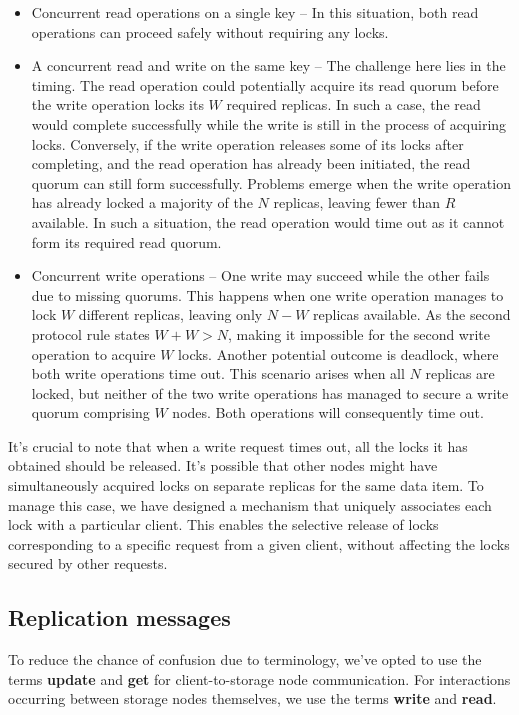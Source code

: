 \documentclass[a4paper, 11pt]{article}
\begin{document}
\begin{itemize}
    \item Concurrent read operations on a single key -- In this situation, both read operations can proceed safely without requiring any locks.
    
    \item A concurrent read and write on the same key -- The challenge here lies in the timing. The read operation could potentially acquire its read quorum before the write operation locks its $ W $ required replicas. In such a case, the read would complete successfully while the write is still in the process of acquiring locks. Conversely, if the write operation releases some of its locks after completing, and the read operation has already been initiated, the read quorum can still form successfully. Problems emerge when the write operation has already locked a majority of the $ N $ replicas, leaving fewer than $ R $ available. In such a situation, the read operation would time out as it cannot form its required read quorum.
    
    \item Concurrent write operations -- One write may succeed while the other fails due to missing quorums. This happens when one write operation manages to lock $ W $ different replicas, leaving only $ N-W $ replicas available. As the second protocol rule states $ W + W > N $, making it impossible for the second write operation to acquire $ W $ locks. Another potential outcome is deadlock, where both write operations time out. This scenario arises when all $ N $ replicas are locked, but neither of the two write operations has managed to secure a write quorum comprising $ W $ nodes. Both operations will consequently time out.
\end{itemize}

It's crucial to note that when a write request times out, all the locks it has obtained should be released. It's possible that other nodes might have simultaneously acquired locks on separate replicas for the same data item. To manage this case, we have designed a mechanism that uniquely associates each lock with a particular client. This enables the selective release of locks corresponding to a specific request from a given client, without affecting the locks secured by other requests.


\subsection{Replication messages}\label{Replication_Messages}
\begin{Summary}[Convention]
To reduce the chance of confusion due to terminology, we've opted to use the terms \textbf{update} and \textbf{get} for client-to-storage node communication. For interactions occurring between storage nodes themselves, we use the terms \textbf{write} and \textbf{read}.
\end{Summary}
\end{document}

